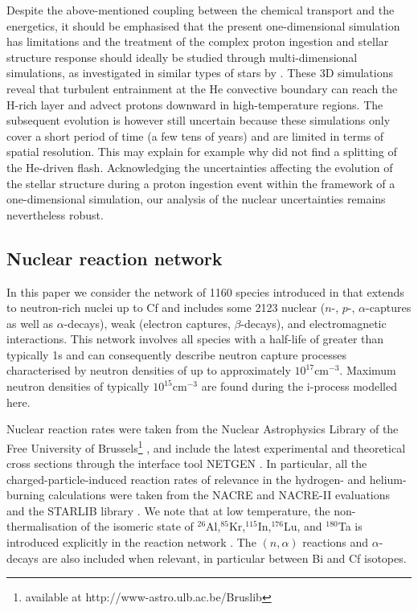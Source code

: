 \documentclass{aa}
\def\iso#1{$^{#1}$}
\def\cm3{cm$^{-3}$}
\begin{document}
Despite the above-mentioned coupling between the chemical transport
and the energetics, it should be emphasised that the present
one-dimensional simulation has limitations and the treatment of the complex proton ingestion and stellar
structure response should ideally be studied through multi-dimensional
simulations, as investigated in similar types of stars  by
\citet{Mocak10,Mocak11,Stancliffe11,Herwig14,Woodward15}. These 3D simulations reveal
that turbulent entrainment at the He convective boundary can reach the
H-rich layer and advect protons downward in high-temperature regions. The subsequent evolution is however still
uncertain because these simulations only cover a short period of time
(a few tens of years) and are limited in terms of spatial resolution.
This may explain for example why \cite{Stancliffe11} did not find a splitting of
the He-driven flash. Acknowledging the uncertainties affecting the evolution of
the stellar structure during a proton ingestion event within the framework of a one-dimensional
simulation, our analysis of the nuclear uncertainties remains nevertheless robust.


\subsection{Nuclear reaction network}
\label{sect_nucnet}
In this paper we consider the network of 1160 species introduced in \citet{Choplin21} that extends to neutron-rich nuclei up to Cf and includes some  2123 nuclear ($n$-, $p$-, $\alpha$-captures as well as $\alpha$-decays), weak (electron captures, $\beta$-decays), and electromagnetic interactions. This network involves all species with a half-life of greater than typically 1s and can consequently describe neutron capture processes characterised by neutron densities of up to approximately $10^{17}$\cm3. Maximum neutron densities of typically $10^{15}$\cm3 are found during the i-process modelled here.


Nuclear reaction rates were taken from the Nuclear Astrophysics Library of the Free University of Brussels\footnote{available at http://www-astro.ulb.ac.be/Bruslib} \citep{arnould06}, and include the latest experimental and theoretical cross sections through the interface tool NETGEN \citep{Xu13}. In particular, all the charged-particle-induced reaction rates of relevance in the hydrogen- and
helium-burning calculations were taken from the NACRE and NACRE-II evaluations \citep{Angulo99,Xu13b} and the STARLIB library \citep{Sallaska13}.
 We note that at low temperature, the non-thermalisation of the isomeric state of \iso{26}Al,\iso{85}Kr,\iso{115}In,\iso{176}Lu,  and \iso{180}Ta is introduced explicitly in the reaction network \citep{Kappeler89,Nemeth94}.
The $(n,\alpha)$ reactions and $\alpha$-decays are also included when relevant, in particular between Bi and Cf isotopes.
\end{document}

